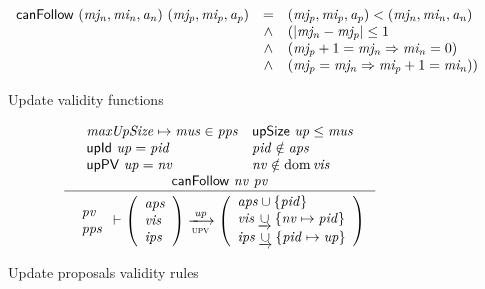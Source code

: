 \begin{figure}[htb]
  \begin{equation}
    \label{eq:func:can-follow}
    \begin{array}{r c l}
      \mathsf{canFollow}~(\mathit{mj_n}, \mathit{mi_n}, \mathit{a_n})~(\mathit{mj_p}, \mathit{mi_p}, \mathit{a_p})
      & = & (\mathit{mj_p}, \mathit{mi_p}, \mathit{a_p}) < (\mathit{mj_n}, \mathit{mi_n}, \mathit{a_n})\\
      & \wedge & (|\mathit{mj_n} - \mathit{mj_p}| \leq 1\\
      & \wedge & (\mathit{mj_p} + 1 = \mathit{mj_n} \Rightarrow \mathit{mi_n} = 0)\\
      & \wedge & (\mathit{mj_p} = \mathit{mj_n} \Rightarrow \mathit{mi_p} + 1 = \mathit{mi_n}))
    \end{array}
  \end{equation}
  \caption{Update validity functions}
\end{figure}

\setpremisesspace{15pt}
\begin{figure}[htb]
  \begin{equation}
    \label{eq:rule:up-validity}
    \inference
    {
      {\begin{array}{l l}
        \var{maxUpSize} \mapsto \var{mus} \in \var{pps}
        & \upSize{up} \leq \var{mus}\\
        \upId{up} = \var{pid}
        & \var{pid} \notin \var{aps} \\
        \upPV{up} = \var{nv}
        & \var{nv} \notin \dom \var{vis}\\
       \end{array}}\\
     \fun{canFollow}~\var{nv}~\var{pv}
    }
    {
      {
        \begin{array}{l}
          \var{pv}\\
          \var{pps}
        \end{array}
      }
      \vdash
      {
        \left(
          \begin{array}{l}
            \var{aps}\\
            \var{vis}\\
            \var{ips}
          \end{array}
        \right)
      }
      \trans{upv}{\var{up}}
      {
        \left(
          \begin{array}{l}
            \var{aps \cup \{\var{pid}\}}\\
            \var{vis} \unionoverride \{ \var{nv} \mapsto \var{pid} \}\\
            \var{ips} \unionoverride \{ \var{pid} \mapsto \var{up} \}
          \end{array}
        \right)
      }
    }
  \end{equation}
  \caption{Update proposals validity rules}
  \label{fig:rules:up-validity}
\end{figure}

